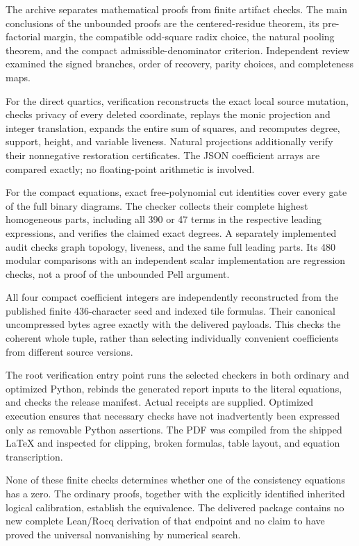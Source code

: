 The archive separates mathematical proofs from finite artifact checks.
The main conclusions of the unbounded proofs are the centered-residue
theorem, its pre-factorial margin, the compatible odd-square radix
choice, the natural pooling theorem, and the compact admissible-denominator
criterion. Independent review examined the signed branches, order of
recovery, parity choices, and completeness maps.

For the direct quartics, verification reconstructs the exact local source
mutation, checks privacy of every deleted coordinate, replays the monic
projection and integer translation, expands the entire sum of squares,
and recomputes degree, support, height, and variable liveness. Natural
projections additionally verify their nonnegative restoration certificates.
The JSON coefficient arrays are compared exactly; no floating-point
arithmetic is involved.

For the compact equations, exact free-polynomial cut identities cover
every gate of the full binary diagrams. The checker collects their
complete highest homogeneous parts, including all 390 or 47 terms in
the respective leading expressions, and verifies the claimed exact
degrees. A separately implemented audit checks graph topology, liveness,
and the same full leading parts. Its 480 modular comparisons with an
independent scalar implementation are regression checks, not a proof
of the unbounded Pell argument.

All four compact coefficient integers are independently reconstructed
from the published finite 436-character seed and indexed tile formulas.
Their canonical uncompressed bytes agree exactly with the delivered
payloads. This checks the coherent whole tuple, rather than selecting
individually convenient coefficients from different source versions.

The root verification entry point runs the selected checkers in both
ordinary and optimized Python, rebinds the generated report inputs to
the literal equations, and checks the release manifest. Actual receipts
are supplied. Optimized execution ensures that necessary checks have
not inadvertently been expressed only as removable Python assertions.
The PDF was compiled from the shipped LaTeX and inspected for clipping,
broken formulas, table layout, and equation transcription.

None of these finite checks determines whether one of the consistency
equations has a zero. The ordinary proofs, together with the explicitly
identified inherited logical calibration, establish the equivalence.
The delivered package contains no new complete Lean/Rocq derivation of
that endpoint and no claim to have proved the universal nonvanishing
by numerical search.
